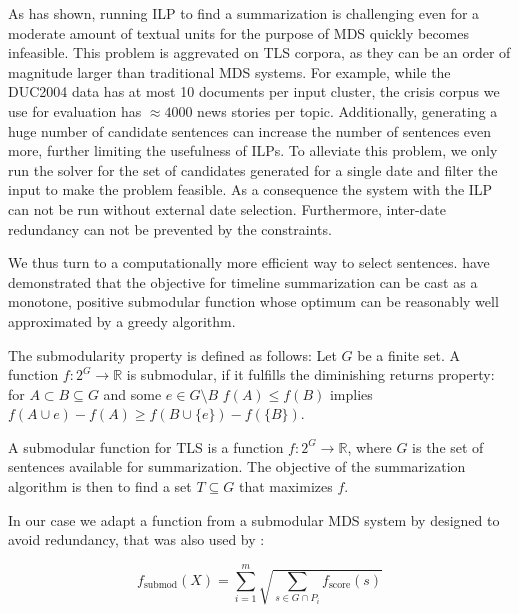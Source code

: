 \documentclass[a4paper,BCOR=10mm]{report}
\begin{document}
As \citet{mcdonald} has shown, running ILP to find a summarization is challenging even for a moderate amount of textual units for the purpose of MDS quickly becomes infeasible.
This problem is aggrevated on TLS corpora, as they can be an order of magnitude larger than traditional MDS systems. For example, while the DUC2004 data has at most 10 documents per input cluster, the crisis corpus we use for evaluation has $\approx 4000$ news stories per topic. Additionally, generating a huge number of candidate sentences can increase the number of sentences even more, further limiting the usefulness of ILPs.
To alleviate this problem, we only run the solver for the set of candidates generated for a single date and filter the input to make the problem feasible. As a consequence the system with the ILP can not be run without external date selection. Furthermore, inter-date redundancy can not be prevented by the constraints.


We thus turn to a computationally more efficient way to select sentences.
\citet{markert} have demonstrated that the objective for timeline summarization can be cast as a monotone, positive submodular function whose optimum can be reasonably well approximated by a greedy algorithm.

The submodularity property is defined as follows:
 Let $G$ be a finite set. A function $f: 2^{G} \rightarrow \mathbb{R}$ is submodular, if it fulfills the diminishing returns property: for $A \subset B \subseteq G$ and some $e \in G \setminus B$ $f(A) \leq f(B)$ implies $f(A \cup e) - f(A) \geq f(B \cup \{e\}) - f(\{B\})$.

A submodular function for TLS is a function $f: 2^{G} \rightarrow \mathbb{R}$, where $G$ is the set of sentences available for summarization.
The objective of the summarization algorithm is then to find a set $T \subseteq G$ that maximizes $f$.

In our case we adapt a function from a submodular MDS system by \citet{lin+blimes} designed to avoid redundancy, that was also used by \citet{markert}:

\begin{displaymath}
f_{\text{submod}}(X) = \sum_{i = 1}^{m} \sqrt{\sum_{s \in G \cap P_i} f_{\text{score}}(s)}
\end{displaymath}
\end{document}
